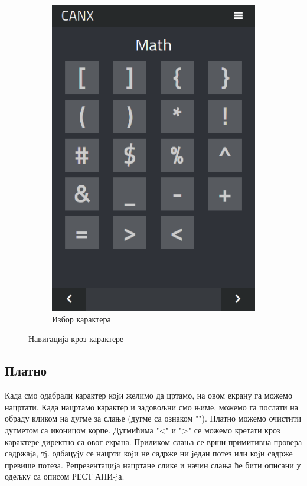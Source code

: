 \documentclass[a4paper]{article}
\begin{document}
\begin{figure}
\begin{subfigure}{.5\textwidth}
  \includegraphics[width=.9\linewidth]{letters}
  \caption{Избор карактера}
  \label{fig:sub2}
\end{subfigure}
\caption{Навигација кроз карактере}
\label{fig:test}
\end{figure}

\subsection{Платно}
\label{canvas}
Када смо одабрали карактер коjи желимо да цртамо, на овом екрану га
можемо нацртати. Када нацртамо карактер и задовољни смо њиме, можемо
га послати на обраду кликом на дугме за слање (дугме са ознаком "\checkmark").
Платно можемо очистити дугметом са иконицом корпе. Дугмићима "<" и
">" се можемо кретати кроз карактере директно са овог екрана. Приликом
слања се врши примитивна провера садржаjа, тj. одбацуjу се нацрти коjи
не садрже ни jедан потез или коjи садрже превише потеза. Репрезентациjа
нацртане слике и начин слања ће бити описани у одељку са описом РЕСТ
АПИ-jа.
\end{document}
